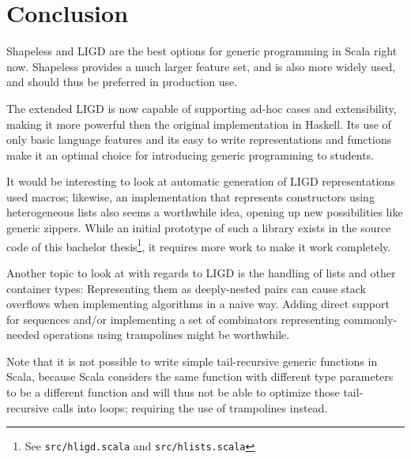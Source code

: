 \chapter{Conclusion}
Shapeless and LIGD are the best options for generic programming in Scala
right now. Shapeless provides a much larger feature set, and is also more
widely used, and should thus be preferred in production use.

The extended LIGD is now capable of supporting ad-hoc cases and extensibility,
making it more powerful then the original implementation in Haskell. Its use
of only basic language features and its easy to write representations and
functions make it an optimal choice for introducing generic programming to
students.

It would be interesting to look at automatic generation of LIGD representations
used macros; likewise, an implementation that represents constructors using
heterogeneous lists also seems a worthwhile idea, opening up new possibilities
like generic zippers. While an initial prototype of such a library exists in
the source code of this bachelor thesis\footnote{See \texttt{src/hligd.scala} and
\texttt{src/hlists.scala}}, it requires more work to make it work completely.

Another topic to look at with regards to LIGD is the handling of lists and
other container types: Representing them as deeply-nested pairs can cause
stack overflows when implementing algorithms in a naive way. Adding direct
support for sequences and/or implementing a set of combinators representing
commonly-needed operations using trampolines might be worthwhile.

Note that it is not possible to write simple tail-recursive generic functions in Scala,
because Scala considers the same function with different type parameters
to be a different function and will thus not be able to optimize those
tail-recursive calls into loops; requiring the use of trampolines instead.
